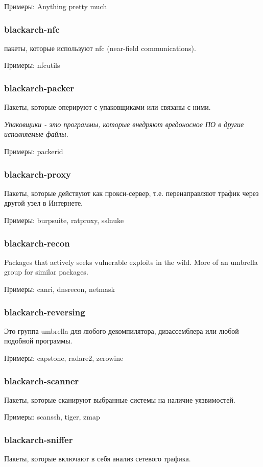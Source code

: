 \documentclass[a4paper, oneside, 11pt]{book}
\begin{document}
Примеры: Anything pretty much

\subsubsection{blackarch-nfc}
пакеты, которые используют nfc (near-field communications).

Примеры: nfcutils

\subsubsection{blackarch-packer}
Пакеты, которые оперируют с упаковщиками или связаны с ними.

\textit{Упаковщики - это программы, которые внедряют вредоносное ПО в другие исполняемые файлы.}

Примеры: packerid

\subsubsection{blackarch-proxy}
Пакеты, которые действуют как прокси-сервер, т.е.
перенаправляют трафик через другой узел в Интернете.

Примеры: burpsuite, ratproxy, sslnuke

\subsubsection{blackarch-recon}
Packages that actively seeks vulnerable exploits in the
wild. More of an umbrella group for similar packages.

Примеры: canri, dnsrecon, netmask

\subsubsection{blackarch-reversing}
Это группа umbrella для любого декомпилятора,
дизассемблера или любой подобной программы.

Примеры: capstone, radare2, zerowine

\subsubsection{blackarch-scanner}
Пакеты, которые сканируют выбранные системы на наличие уязвимостей.

Примеры: scanssh, tiger, zmap

\subsubsection{blackarch-sniffer}
Пакеты, которые включают в себя анализ сетевого трафика.
\end{document}
